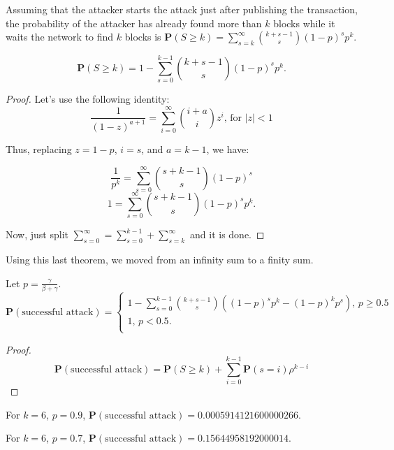 Assuming that the attacker starts the attack just after publishing the transaction, the probability of the attacker has already found more than $k$ blocks while it waits the network to find $k$ blocks is $\mathbf{P}(S \geq k) = \sum_{s=k}^{\infty} \binom{k+s-1}{s} (1-p)^s p^k$.

\begin{theorem}
	$$\mathbf{P}(S \geq k) = 1 - \sum_{s=0}^{k-1} \binom{k+s-1}{s} (1-p)^s p^k.$$
\end{theorem}
\begin{proof}
	Let's use the following identity:
	$$\frac{1}{(1-z)^{a+1}} = \sum_{i=0}^{\infty} \binom{i+a}{i} z^i \text{, for $|z|<1$}$$

	Thus, replacing $z=1-p$, $i=s$, and $a=k-1$, we have:

	$$\frac{1}{p^{k}} = \sum_{s=0}^{\infty} \binom{s+k-1}{s} (1-p)^s$$
	$$1 = \sum_{s=0}^{\infty} \binom{s+k-1}{s} (1-p)^s p^k.$$

	Now, just split $\sum_{s=0}^{\infty} = \sum_{s=0}^{k-1} + \sum_{s=k}^{\infty}$ and it is done.
\end{proof}

Using this last theorem, we moved from an infinity sum to a finity sum.

\begin{theorem}
	Let $p = \frac{\gamma}{\beta + \gamma}$.
$$
\mathbf{P}(\text{successful attack}) =
\begin{cases}
	1 - \sum_{s=0}^{k-1} \binom{k+s-1}{s} \left( (1-p)^s p^k - (1-p)^k p^s \right) \text{, $p \geq 0.5$} \\
	1 \text{, $p < 0.5$}.\\
\end{cases}
$$
\end{theorem}
\begin{proof}
$$
\mathbf{P}(\text{successful attack}) = \mathbf{P}(S \geq k) + \sum_{i=0}^{k-1} \mathbf{P}(s=i) \rho^{k-i}
$$
\end{proof}


For $k=6$, $p=0.9$, $\mathbf{P}(\text{successful attack}) = 0.0005914121600000266$.

For $k=6$, $p=0.7$, $\mathbf{P}(\text{successful attack}) = 0.15644958192000014$.

